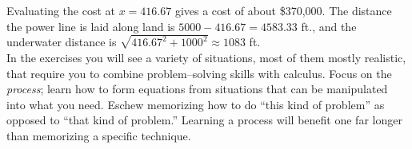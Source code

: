 {Evaluating the cost at $x=416.67$ gives a cost of about \$370,000. The distance the power line is laid along land is $5000-416.67 = 4583.33$ ft., and the underwater distance is $\sqrt{416.67^2+1000^2} \approx 1083$ ft.
}\\

In the exercises you will see a variety of situations, most of them mostly realistic, that require you to combine problem--solving skills with calculus. Focus on the \textit{process}; learn how to form equations from situations that can be manipulated into what you need. Eschew memorizing how to do ``this kind of problem'' as opposed to ``that kind of problem.'' Learning a process will benefit one far longer than memorizing a specific technique.

		